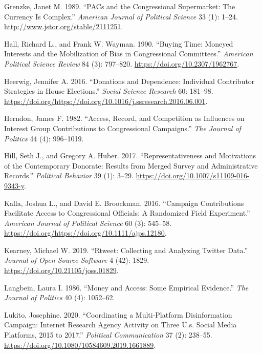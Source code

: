 \documentclass[12pt,]{article}
\begin{document}
\leavevmode\hypertarget{ref-grenzke1989}{}%
Grenzke, Janet M. 1989. ``PACs and the Congressional Supermarket: The
Currency Is Complex.'' \emph{American Journal of Political Science} 33
(1): 1--24. \url{http://www.jstor.org/stable/2111251}.

\leavevmode\hypertarget{ref-hall1990}{}%
Hall, Richard L., and Frank W. Wayman. 1990. ``Buying Time: Moneyed
Interests and the Mobilization of Bias in Congressional Committees.''
\emph{American Political Science Review} 84 (3): 797--820.
\url{https://doi.org/10.2307/1962767}.

\leavevmode\hypertarget{ref-heerwig2016}{}%
Heerwig, Jennifer A. 2016. ``Donations and Dependence: Individual
Contributor Strategies in House Elections.'' \emph{Social Science
Research} 60: 181--98.
\url{https://doi.org/https://doi.org/10.1016/j.ssresearch.2016.06.001}.

\leavevmode\hypertarget{ref-herndon1982}{}%
Herndon, James F. 1982. ``Access, Record, and Competition as Influences
on Interest Group Contributions to Congressional Campaigns.'' \emph{The
Journal of Politics} 44 (4): 996--1019.

\leavevmode\hypertarget{ref-hill2017}{}%
Hill, Seth J., and Gregory A. Huber. 2017. ``Representativeness and
Motivations of the Contemporary Donorate: Results from Merged Survey and
Administrative Records.'' \emph{Political Behavior} 39 (1): 3--29.
\url{https://doi.org/10.1007/s11109-016-9343-y}.

\leavevmode\hypertarget{ref-kalla2015}{}%
Kalla, Joshua L., and David E. Broockman. 2016. ``Campaign Contributions
Facilitate Access to Congressional Officials: A Randomized Field
Experiment.'' \emph{American Journal of Political Science} 60 (3):
545--58. \url{https://doi.org/https://doi.org/10.1111/ajps.12180}.

\leavevmode\hypertarget{ref-rtweet}{}%
Kearney, Michael W. 2019. ``Rtweet: Collecting and Analyzing Twitter
Data.'' \emph{Journal of Open Source Software} 4 (42): 1829.
\url{https://doi.org/10.21105/joss.01829}.

\leavevmode\hypertarget{ref-langbein1986}{}%
Langbein, Laura I. 1986. ``Money and Access: Some Empirical Evidence.''
\emph{The Journal of Politics} 40 (4): 1052--62.

\leavevmode\hypertarget{ref-lukito2020}{}%
Lukito, Josephine. 2020. ``Coordinating a Multi-Platform Disinformation
Campaign: Internet Research Agency Activity on Three U.s. Social Media
Platforms, 2015 to 2017.'' \emph{Political Communication} 37 (2):
238--55. \url{https://doi.org/10.1080/10584609.2019.1661889}.
\end{document}
